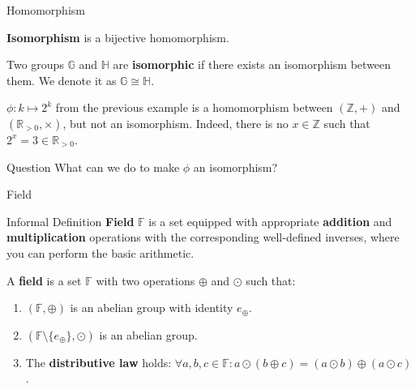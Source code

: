 \documentclass{beamer}
\begin{document}
  \begin{frame}{Homomorphism}
    \begin{definition}
      \textbf{Isomorphism} is a bijective homomorphism.
    \end{definition}

    \begin{definition}
      Two groups $\mathbb{G}$ and $\mathbb{H}$ are \textbf{isomorphic} if there exists an isomorphism between them. We denote it as $\mathbb{G} \cong \mathbb{H}$.
    \end{definition}

    \begin{example}
     $\phi: k \mapsto 2^k$ from the previous example is a homomorphism between $(\mathbb{Z},+)$ and $(\mathbb{R}_{>0},\times)$, but not an isomorphism. Indeed, there is no $x \in \mathbb{Z}$ such that $2^x = 3 \in \mathbb{R}_{>0}$.
    \end{example}

    \begin{alertblock}{Question}
      What can we do to make $\phi$ an isomorphism?
     \end{alertblock}
  \end{frame}

  \begin{frame}{Field}
    \begin{block}{Informal Definition}
        \textbf{Field} $\mathbb{F}$ is a set equipped with appropriate \textbf{addition} and \textbf{multiplication} operations with the corresponding well-defined inverses, where you can perform the basic arithmetic.
    \end{block}
    
      \begin{definition}
        A \textbf{field} is a set $\mathbb{F}$ with two operations $\oplus$ and $\odot$ such that:
        \begin{enumerate}
            \item $(\mathbb{F}, \oplus)$ is an abelian group with identity $e_{\oplus}$.
            \item $(\mathbb{F} \setminus \{e_{\oplus}\}, \odot)$ is an abelian group.
            \item The \textbf{distributive law} holds: $\forall a,b,c \in \mathbb{F}: a \odot (b \oplus c) = (a \odot b) \oplus (a \odot c)$.
        \end{enumerate}
      \end{definition}
    \end{frame}
\end{document}
